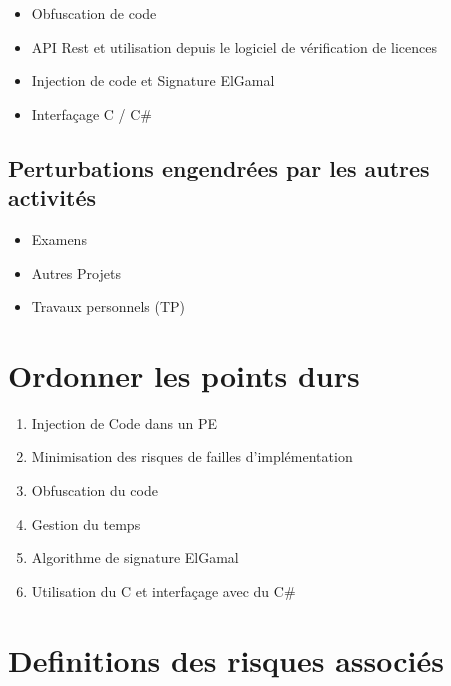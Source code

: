 \begin{itemize}
	\item Obfuscation de code
	\item API Rest et utilisation depuis le logiciel de vérification de licences
	\item Injection de code et Signature ElGamal
	\item Interfaçage C / C\#
\end{itemize}

\section{Perturbations engendrées par les autres activités}
\begin{itemize}
	\item Examens
	\item Autres Projets
	\item Travaux personnels (TP)
\end{itemize}

\chapter{Ordonner les points durs}
\begin{enumerate}
	\item Injection de Code dans un PE
	\item Minimisation des risques de failles d'implémentation
	\item Obfuscation du code
	\item Gestion du temps
	\item Algorithme de signature ElGamal
	\item Utilisation du C et interfaçage avec du C\# 
\end{enumerate}

\chapter{Definitions des risques associés}

